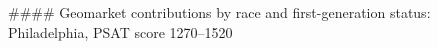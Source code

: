 #### Geomarket contributions by race and first-generation status: Philadelphia, PSAT score 1270–1520
